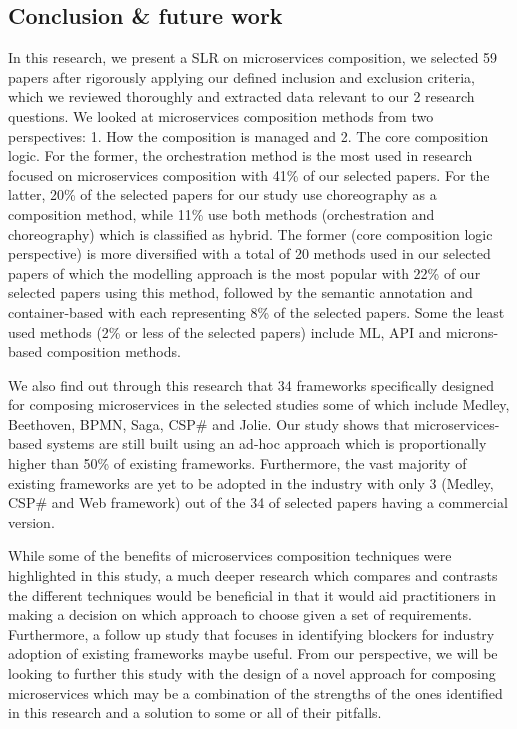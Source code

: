 \documentclass{article}
\begin{document}
\begin{multicols}{2}
\section{Conclusion \& future work}

In this research, we present a SLR on microservices composition, we selected 59 papers after rigorously applying our defined inclusion and exclusion criteria, which we reviewed thoroughly and extracted data relevant to our 2 research questions. We looked at microservices composition methods from two perspectives: 1. How the composition is managed and 2. The core composition logic. For the former, the orchestration method is the most used in research focused on microservices composition with 41\% of our selected papers. For the latter, 20\% of the selected papers for our study use choreography as a composition method, while 11\% use both methods (orchestration and choreography) which is classified as hybrid. The former (core composition logic perspective) is more diversified with a total of 20 methods used in our selected papers of which the modelling approach is the most popular with 22\% of our selected papers using this method, followed by the semantic annotation and container-based with each representing 8\% of the selected papers. Some the least used methods (2\% or less of the selected papers) include ML, API and microns-based composition methods. 

We also find out through this research that 34 frameworks specifically designed for composing microservices in the selected studies some of which include Medley, Beethoven, BPMN, Saga, CSP\# and Jolie. Our study shows that microservices-based systems are still built using an ad-hoc approach which is proportionally higher than 50\% of existing frameworks. Furthermore, the vast majority of existing frameworks are yet to be adopted in the industry with only 3 (Medley, CSP\# and Web framework) out of the 34 of selected papers having a commercial version.

While some of the benefits of microservices composition techniques were highlighted in this study, a much deeper research which compares and contrasts the different techniques would be beneficial in that it would aid practitioners in making a decision on which approach to choose given a set of requirements. Furthermore, a follow up study that focuses in identifying blockers for industry adoption of existing frameworks maybe useful. From our perspective, we will be looking to further this study with the design of a novel approach for composing microservices which may be a combination of the strengths of the ones identified in this research and a solution to some or all of their pitfalls.

\end{multicols}
\pagebreak 
\end{document}
